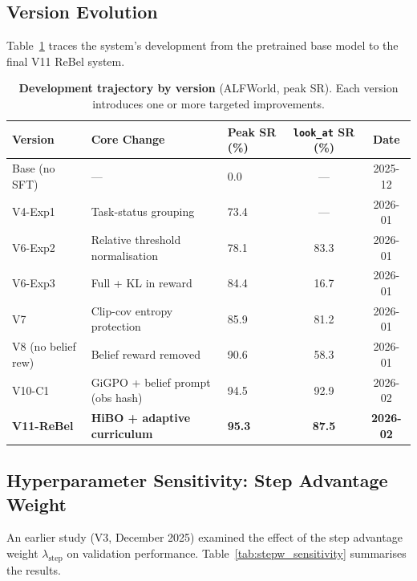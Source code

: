 \subsection{Version Evolution}

Table~\ref{tab:version_evolution} traces the system's development from the
pretrained base model to the final V11 ReBel system.

\begin{table}[h]
  \centering
  \caption{%
    \textbf{Development trajectory by version} (ALFWorld, peak SR).
    Each version introduces one or more targeted improvements.
  }
  \label{tab:version_evolution}
  \vspace{4pt}
  \small
  \renewcommand{\arraystretch}{1.15}
  \begin{tabular}{@{}lllcc@{}}
    \toprule
    \textbf{Version} & \textbf{Core Change} & \textbf{Peak SR (\%)} & \textbf{\texttt{look\_at} SR (\%)} & \textbf{Date} \\
    \midrule
    Base (no SFT)     & ---                              & 0.0            & ---           & 2025-12 \\
    V4-Exp1           & Task-status grouping             & 73.4           & ---           & 2026-01 \\
    V6-Exp2           & Relative threshold normalisation & 78.1           & 83.3          & 2026-01 \\
    V6-Exp3           & Full + KL in reward              & 84.4           & 16.7          & 2026-01 \\
    V7                & Clip-cov entropy protection      & 85.9           & 81.2          & 2026-01 \\
    V8 (no belief rew) & Belief reward removed           & 90.6           & 58.3          & 2026-01 \\
    V10-C1            & GiGPO + belief prompt (obs hash) & 94.5           & 92.9          & 2026-02 \\
    \textbf{V11-ReBel} & \textbf{HiBO + adaptive curriculum} & \textbf{95.3} & \textbf{87.5} & \textbf{2026-02} \\
    \bottomrule
  \end{tabular}
\end{table}

\subsection{Hyperparameter Sensitivity: Step Advantage Weight}

An earlier study (V3, December 2025) examined the effect of the step advantage
weight $\lambda_{\text{step}}$ on validation performance.
Table~\ref{tab:stepw_sensitivity} summarises the results.

